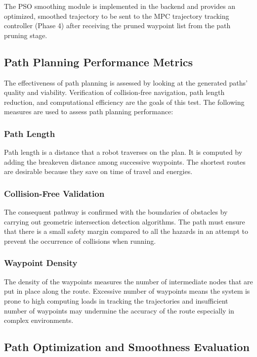 The PSO smoothing module is implemented in the backend and provides an optimized, smoothed trajectory to be sent to the MPC trajectory tracking controller (Phase 4) after receiving the pruned waypoint list from the path pruning stage.

\subsection{Path Planning Performance Metrics}

The effectiveness of path planning is assessed by looking at the generated paths' quality and viability. Verification of collision-free navigation, path length reduction, and computational efficiency are the goals of this test.
The following measures are used to assess path planning performance:


\subsubsection{Path Length}


Path length is a distance that a robot traverses on the plan. It is computed by adding the breakeven distance among successive waypoints. The shortest routes are desirable because they save on time of travel and energies.
\subsubsection{Collision-Free Validation}

The consequent pathway is confirmed with the boundaries of obstacles by carrying out geometric intersection detection algorithms. The path must ensure that there is a small safety margin compared to all the hazards in an attempt to prevent the occurrence of collisions when running.

\subsubsection{Waypoint Density}

The density of the waypoints measures the number of intermediate nodes that are put in place along the route. Excessive number of waypoints means the system is prone to high computing loads in tracking the trajectories and insufficient number of waypoints may undermine the accuracy of the route especially in complex environments.
\subsection{Path Optimization and Smoothness Evaluation}

